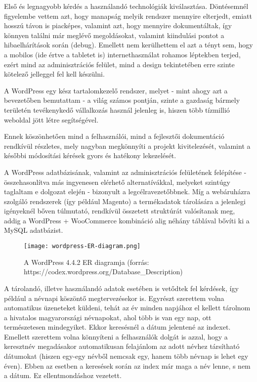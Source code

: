 
Első és legnagyobb kérdés a használandó technológiák kiválasztása. Döntésemnél figyelembe vettem azt, hogy manapság melyik rendszer mennyire elterjedt, emiatt hosszú távon is piacképes, valamint azt, hogy mennyire dokumentáltak, így könnyen találni már meglévő megoldásokat, valamint kiindulási pontot a hibaelhárítások során (debug). Emellett nem kerülhettem el azt a tényt sem, hogy a mobilos (ide értve a tabletet is) internethasználat rohamos léptekben terjed, ezért mind az adminisztrációs felület, mind a design tekintetében erre szinte kötelező jelleggel fel kell készülni.


A WordPress egy kész tartalomkezelő rendszer, melyet - mint ahogy azt a bevezetőben bemutattam - a világ számos pontján, szinte a gazdaság bármely területén tevékenykedő vállalkozás használ jelenleg is, hiszen több tízmillió weboldal jött létre segítségével.

Ennek köszönhetően mind a felhasználói, mind a fejlesztői dokumentáció rendkívül részletes, mely nagyban megkönnyíti a projekt kivitelezését, valamint a későbbi módosítási kérések gyors és hatékony lekezelését.

A WordPress adatbázisának, valamint az adminisztrációs felületének felépítése - összehasonlítva más ingyenesen elérhető alternatívákkal, melyeket szintúgy taglaltam e dolgozat elején - bizonyult a legcélravezetőbbnek. Míg a webáruházra szolgáló rendszerek (így például Magento) a termékadatok tárolására a jelenlegi igényeknél bőven túlmutató, rendkívül összetett struktúrát valósítanak meg, addig a WordPress + WooCommerce kombináció alig néhány táblával bővíti ki a MySQL adatbázist.

\begin{figure}[H]
	\texttt{[image: wordpress-ER-diagram.png]}
	\caption{A WordPress 4.4.2 ER diagramja (forrás: https://codex.wordpress.org/Database\_Description)}
\end{figure}


A tárolandó, illetve használandó adatok esetében is vetődtek fel kérdések, így például a névnapi köszöntő megtervezésekor is. Egyrészt szerettem volna automatikus üzeneteket küldeni, tehát az év minden napjához el kellett tárolnom a hivatalos magyarországi névnapokat, ahol több is van egy nap, ott természetesen mindegyiket. Ekkor keresésnél a dátum jelentené az indexet. Emellett szerettem volna könnyíteni a felhasználók dolgát is azzal, hogy a keresztnév megadásakor automatikusan felajánlom az adott névhez társítható dátumokat (hiszen egy-egy névből nemcsak egy, hanem több névnap is lehet egy éven). Ebben az esetben a keresések során az index már maga a név lenne, s nem a dátum. Ez ellentmondáshoz vezetett.

